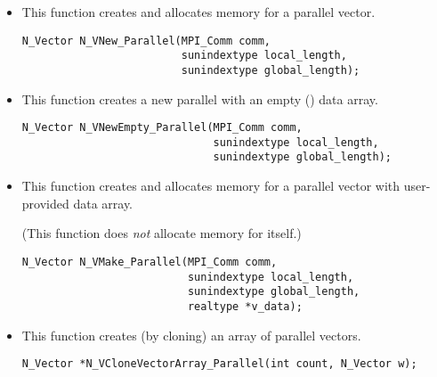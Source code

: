 \begin{itemize}


\item  {}
  
  This function creates and allocates memory for a parallel vector.
 
  

\begin{verbatim}
N_Vector N_VNew_Parallel(MPI_Comm comm, 
                         sunindextype local_length, 
                         sunindextype global_length);
\end{verbatim}
  

\item {}
 
  This function creates a new parallel  with an empty () data array.
 
  

\begin{verbatim}
N_Vector N_VNewEmpty_Parallel(MPI_Comm comm, 
                              sunindextype local_length, 
                              sunindextype global_length);
\end{verbatim}

  

\item {}
  
  This function creates and allocates memory for a parallel vector
  with user-provided data array.
 
  (This function does {\em not} allocate memory for  itself.)

\begin{verbatim}
N_Vector N_VMake_Parallel(MPI_Comm comm, 
                          sunindextype local_length,
                          sunindextype global_length,
                          realtype *v_data);
\end{verbatim}


\item {}
 
  This function creates (by cloning) an array of  parallel vectors.
 
\begin{verbatim}
N_Vector *N_VCloneVectorArray_Parallel(int count, N_Vector w);
\end{verbatim}


\end{itemize}

